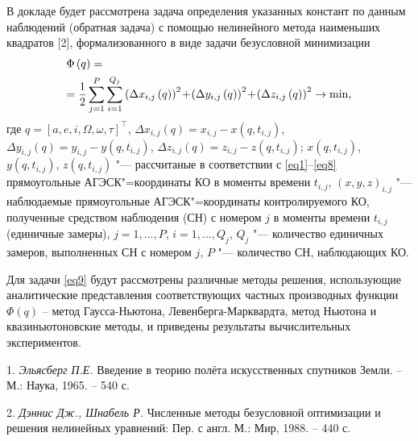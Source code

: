 В докладе будет рассмотрена задача определения указанных констант по данным наблюдений (обратная задача) с помощью нелинейного метода наименьших квадратов [2], формализованного в виде задачи безусловной минимизации
\vskip-7mm
\begin{equation}
\label{eq9}
\begin{gathered}
	\Phi \left( q \right) = \hfill \\
	= \frac{1}{2}\sum\limits_{j = 1}^P {\sum\limits_{i = 1}^{{Q_j}} {{{\left( {\Delta {x_{i,j}}\left( q \right)} \right)}^2}
\!+\!
{{\left( {\Delta {y_{i,j}}\left( q \right)} \right)}^2}
\!+\!
{{\left( {\Delta {z_{i,j}}\left( q \right)} \right)}^2} \to \min } ,} \hfill \\
\end{gathered}
\end{equation}
\vskip-5mm
\noindent
где
$q = {\left[ {a,e,i,\Omega ,\omega ,\tau } \right]^{\top}}$,
$\Delta {x_{i,j}}\left( q \right) = {x_{i,j}} \!-\! x\left( {q,{t_{i,j}}} \right)$,
$\Delta {y_{i,j}}\left( q \right) = {y_{i,j}} \!-\! y\left( {q,{t_{i,j}}} \right)$,
$\Delta {z_{i,j}}\left( q \right) = {z_{i,j}} \!-\! z\left( {q,{t_{i,j}}} \right)$;
$x\left( {q,{t_{i,j}}} \right)$,
$y\left( {q,{t_{i,j}}} \right)$,
$z\left( {q,{t_{i,j}}} \right)$ "---
рассчитаные в соответствии с \eqref{eq1}--\eqref{eq8} прямоугольные АГЭСК"=координаты КО в моменты времени
${t_{i,j}}$,
${\left( {x,y,z} \right)_{i,j}}$ "---
наблюдаемые прямоугольные АГЭСК"=координаты контролируемого КО,
полученные средством наблюдения (СН) с номером $j$ в моменты времени
${t_{i,j}}$ (единичные замеры),
$j=1,...,P$,
$i=1,...,Q_j$,
$Q_j$ "--- количество единичных замеров, выполненных СН с номером $j$,
$P$ "--- количество СН, наблюдающих КО.

Для задачи \eqref{eq9} будут рассмотрены различные методы решения, использующие аналитические представления соответствующих частных производных функции
$\Phi \left( q \right)$
 -- метод Гаусса-Ньютона, Левенберга-Марквардта, метод Ньютона и квазиньютоновские методы, и приведены результаты вычислительных экспериментов.

\litlist

1. {\it Эльясберг П.Е.}
 Введение в теорию полёта искусственных спутников Земли. – М.: Наука, 1965. – 540 с.

2. {\it Дэннис Дж., Шнабель Р.} Численные методы безусловной оптимизации и решения нелинейных уравнений: Пер. с англ. М.: Мир, 1988. – 440 с.
